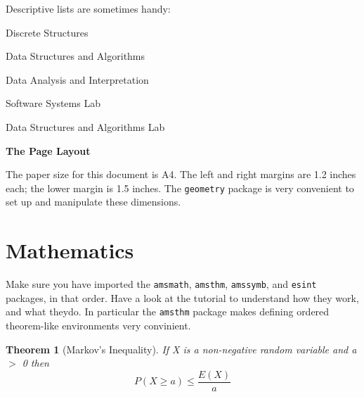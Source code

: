 \documentclass[10pt]{article}
\newtheorem{theorem}{Theorem}
\theoremstyle{remark}
\begin{document}
Descriptive lists are sometimes handy:


\begin{description}[itemsep=-5pt]
	\item [CS 207] Discrete Structures
	\item [CS 213] Data Structures and Algorithms
	\item [CS 215] Data Analysis and Interpretation
	\item [CS 251] Software Systems Lab
	\item [CS 293] Data Structures and Algorithms Lab
\end{description}	






\large{\textbf{The Page Layout}}
\normalsize

The paper size for this document is A4. The left and right margins are 1.2 inches each; the lower margin is 1.5 inches. The \verb!geometry! package is very convenient to set up and manipulate these dimensions.


\clearpage
\section{Mathematics}
\label{maths}
\renewcommand{\baselinestretch}{-1}
Make sure you have imported the \verb!amsmath!, \verb!amsthm!, \verb!amssymb!, and \verb!esint! packages, in that order. Have a look at the tutorial to understand how they work, and what theydo. In particular the \verb!amsthm! package makes defining ordered theorem-like environments very convinient.



\begin{theorem}[Markov's Inequality]
\label{markov's}
If X is a non-negative random variable and a $ > $ 0 then
\begin{equation*}
P( X \geq a) \leq \frac{E( X )}{a}
\end{equation*}

\end{theorem}
\end{document}
